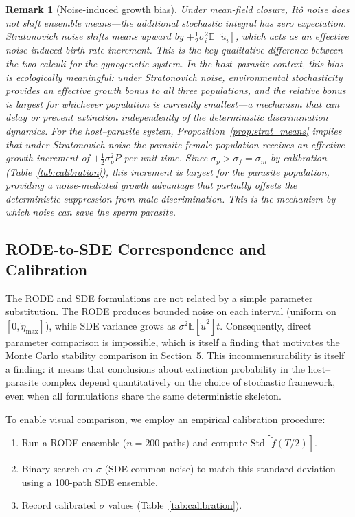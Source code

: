 \documentclass[12pt]{article}
\newtheorem{remark}{Remark}
\begin{document}
\begin{remark}[Noise-induced growth bias]
Under mean-field closure, It\^{o} noise does not shift ensemble means---the additional stochastic integral has zero expectation.  Stratonovich noise shifts means upward by $+\tfrac{1}{2}\sigma_i^2 \mathbb{E}[\tilde{u}_i]$, which acts as an effective noise-induced birth rate increment.  This is the key qualitative difference between the two calculi for the gynogenetic system.
In the host--parasite context, this bias is ecologically meaningful:
under Stratonovich noise, environmental stochasticity provides an
effective growth bonus to all three populations, and the \emph{relative}
bonus is largest for whichever population is currently smallest---a
mechanism that can delay or prevent extinction independently of the
deterministic discrimination dynamics.
For the host--parasite system, Proposition~\ref{prop:strat_means}
implies that under Stratonovich noise the parasite female population
receives an effective growth increment of $+\tfrac{1}{2}\sigma_p^2 P$
per unit time.  Since $\sigma_p > \sigma_f = \sigma_m$ by calibration
(Table~\ref{tab:calibration}), this increment is largest for the
parasite population, providing a noise-mediated growth advantage that
partially offsets the deterministic suppression from male discrimination.
This is the mechanism by which noise can save the sperm parasite.
\end{remark}


\subsection{RODE-to-SDE Correspondence and Calibration}
The RODE and SDE formulations are not related by a simple parameter substitution.  The RODE produces bounded noise on each interval (uniform on $[0, \tilde{\eta}_{\max}]$), while SDE variance grows as $\sigma^2 \mathbb{E}[\tilde{u}^2] t$.  Consequently, direct parameter comparison is impossible, which is itself a finding that motivates the Monte Carlo stability comparison in Section~5.
This incommensurability is itself a finding: it means that conclusions
about extinction probability in the host--parasite complex depend
quantitatively on the choice of stochastic framework, even when all
formulations share the same deterministic skeleton.

To enable visual comparison, we employ an empirical calibration procedure:
\begin{enumerate}
  \item Run a RODE ensemble ($n = 200$ paths) and compute $\text{Std}[\tilde{f}(T/2)]$.
  \item Binary search on $\sigma$ (SDE common noise) to match this standard deviation using a 100-path SDE ensemble.
  \item Record calibrated $\sigma$ values (Table~\ref{tab:calibration}).
\end{enumerate}
\end{document}
